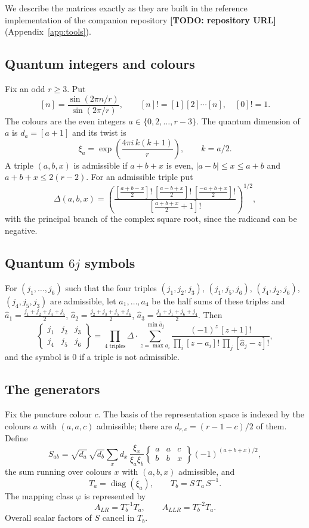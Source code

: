 \documentclass[11pt]{amsart}
\newcommand{\todo}[1]{\textbf{[TODO: #1]}}
\theoremstyle{definition}
\theoremstyle{remark}
\begin{document}
We describe the matrices exactly as they are built in the reference implementation
of the companion repository \todo{repository URL} (Appendix~\ref{app:tools}).

\subsection{Quantum integers and colours}
Fix an odd $r \ge 3$. Put
\[
[n] = \frac{\sin(2\pi n/r)}{\sin(2\pi/r)}, \qquad [n]! = [1][2]\cdots[n], \quad [0]! = 1.
\]
The colours are the even integers $a \in \{0, 2, \dots, r-3\}$. The quantum dimension
of $a$ is $d_a = [a+1]$ and its twist is
\[
\xi_a = \exp\!\left(\frac{4\pi i\, k(k+1)}{r}\right), \qquad k = a/2.
\]
A triple $(a,b,x)$ is admissible if $a+b+x$ is even,
$|a-b| \le x \le a+b$ and $a+b+x \le 2(r-2)$. For an admissible triple put
\[
\Delta(a,b,x) = \left(\frac{[\frac{a+b-x}{2}]!\,[\frac{a-b+x}{2}]!\,[\frac{-a+b+x}{2}]!}{[\frac{a+b+x}{2}+1]!}\right)^{1/2},
\]
with the principal branch of the complex square root, since the radicand can be
negative.

\subsection{Quantum $6j$ symbols}
For $(j_1,\dots,j_6)$ such that the four triples
$(j_1,j_2,j_3)$, $(j_1,j_5,j_6)$, $(j_4,j_2,j_6)$, $(j_4,j_5,j_3)$ are admissible, let
$a_1,\dots,a_4$ be the half sums of these triples and
$\hat a_1 = \frac{j_1+j_2+j_4+j_5}{2}$, $\hat a_2 = \frac{j_2+j_3+j_5+j_6}{2}$,
$\hat a_3 = \frac{j_3+j_1+j_6+j_4}{2}$. Then
\[
\begin{Bmatrix} j_1 & j_2 & j_3 \\ j_4 & j_5 & j_6 \end{Bmatrix}
= \prod_{\text{4 triples}} \Delta \cdot
\sum_{z = \max a_i}^{\min \hat a_j} \frac{(-1)^z\, [z+1]!}{\prod_{i}[z-a_i]!\,\prod_j [\hat a_j - z]!},
\]
and the symbol is $0$ if a triple is not admissible.

\subsection{The generators}
Fix the puncture colour $c$. The basis of the representation space is indexed by the
colours $a$ with $(a,a,c)$ admissible; there are $d_{r,c} = (r-1-c)/2$ of them. Define
\[
S_{ab} = \sqrt{d_a}\,\sqrt{d_b} \sum_{x} d_x\, \frac{\xi_x}{\xi_a\xi_b}
\begin{Bmatrix} a & a & c \\ b & b & x \end{Bmatrix} (-1)^{(a+b+x)/2},
\]
the sum running over colours $x$ with $(a,b,x)$ admissible, and
\[
T_a = \operatorname{diag}(\xi_a), \qquad T_b = S\, T_a\, S^{-1}.
\]
The mapping class $\varphi$ is represented by
\[
A_{LR} = T_b^{-1} T_a, \qquad A_{LLR} = T_b^{-2} T_a .
\]
Overall scalar factors of $S$ cancel in $T_b$.
\end{document}
